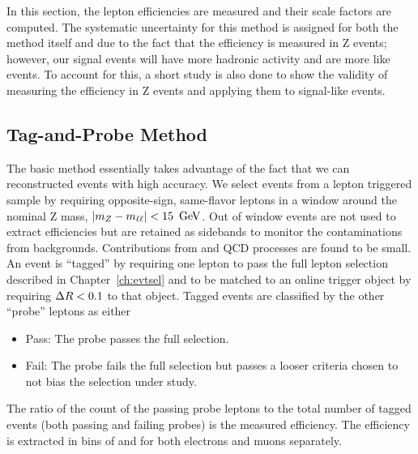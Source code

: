 In this section, the lepton efficiencies are measured and their \dmc scale
factors are computed. The systematic uncertainty for this method is assigned
for both the \tnp method itself and due to the fact that the efficiency is
measured in Z events; however, our signal events will have more hadronic
activity and are more like \ttbar events. To account for this, a short study
is also done to show the validity of measuring the efficiency in Z events and
applying them to signal-like events.

\subsection{Tag-and-Probe Method}
\label {sec:eff_tnp}
The basic \tnp method essentially takes advantage of the fact that we can
reconstructed \Zll events with high accuracy. We select \Zlplm events from a
lepton triggered sample by requiring opposite-sign, same-flavor leptons in
a window around the nominal Z mass, $|m_Z - m_{\ell\ell}| < 15~\,\text{Ge\hspace{-.08em}V}$. Out of window
events are not used to extract efficiencies but are retained as sidebands to
monitor the contaminations from backgrounds. Contributions from \W and QCD
processes are found to be small. An event is ``tagged'' by requiring one lepton
to pass the full lepton selection described in Chapter~\ref{ch:evtsel} and to
be matched to an online trigger object by requiring $\Delta R < 0.1$ to that object.
Tagged events are classified by the other ``probe'' leptons as either
\begin{itemize}
\item Pass: The probe passes the full selection.
\item Fail: The probe fails the full selection but passes a looser criteria
chosen to not bias the selection under study.
\end{itemize}
The ratio of the count of the passing probe leptons to the total number of
tagged events (both passing and failing probes) is the measured efficiency. The
efficiency is extracted in bins of \pt and \aeta for both electrons and muons
separately.

